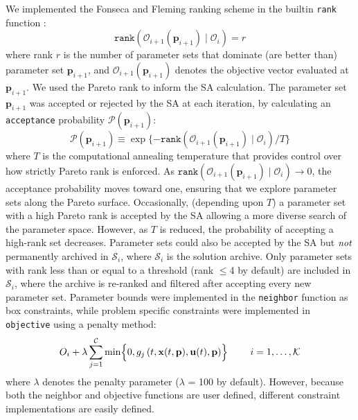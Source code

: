 \documentclass{bmcart}
\begin{document}
We implemented the Fonseca and Fleming ranking scheme in the builtin \texttt{rank} function \cite{RANKING}:
\begin{equation}\label{eqn_rank}
\texttt{rank}\left(\mathcal{O}_{i+1}\left(\mathbf{p}_{i+1}\right)\mid \mathcal{O}_{i}\right)=r
\end{equation} where rank $r$ is the number of parameter sets that dominate (are better than) parameter set $\mathbf{p}_{i+1}$, and $\mathcal{O}_{i+1}\left(\mathbf{p}_{i+1}\right)$
denotes the objective vector evaluated at $\mathbf{p}_{i+1}$.
We used the Pareto rank to inform the SA calculation.
The parameter set $\mathbf{p}_{i+1}$ was accepted or rejected by the SA at each iteration, by calculating an \texttt{acceptance} probability $\mathcal{P}\left(\mathbf{p}_{i+1}\right)$:
\begin{equation}\label{eqn_costMOSA}
\mathcal{P}(\mathbf{p}_{i+1}) \equiv \exp{\{-\texttt{rank}\left(\mathcal{O}_{i+1}\left(\mathbf{p}_{i+1}\right) \mid \mathcal{O}_{i} \right)/T\}}
\end{equation}
where $T$ is the computational annealing temperature that provides control over how strictly Pareto rank is enforced.
As $\texttt{rank}\left(\mathcal{O}_{i+1}\left(\mathbf{p}_{i+1}\right)\mid \mathcal{O}_{i}\right)\rightarrow{0}$, the acceptance probability moves toward one,
ensuring that we explore parameter sets along the Pareto surface.
Occasionally, (depending upon $T$) a parameter set with a high Pareto rank is  accepted by the SA allowing a more diverse search of the parameter space.
However, as $T$ is reduced, the probability of accepting a high-rank set decreases.
Parameter sets could also be accepted by the SA but $\emph{not}$ permanently archived in $\mathcal{S}_{i}$, where $\mathcal{S}_{i}$ is the solution archive.
Only parameter sets with rank less than or equal to a threshold (rank $\leq$4 by default) are included in $\mathcal{S}_{i}$, where the archive is re-ranked and filtered after accepting
every new parameter set.
Parameter bounds were implemented in the \texttt{neighbor} function as box constraints, while problem specific constraints were implemented in \texttt{objective} using a penalty method:
\begin{equation}
  O_{i}+\lambda\sum_{j=1}^{\mathcal{C}}\min\Bigl\{0,g_j\left(t,\mathbf{x}(t,\mathbf{p}),\mathbf{u}(t),\mathbf{p}\right)\Bigr\}\qquad~i=1,\hdots,\mathcal{K}
\end{equation}where $\lambda$ denotes the penalty parameter ($\lambda$ = 100 by default).
However, because both the neighbor and objective functions are user defined, different constraint implementations are easily defined.
\end{document}
